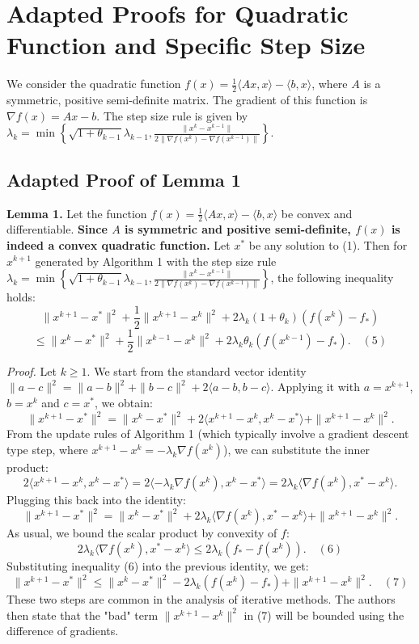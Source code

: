 \documentclass{article}
\begin{document}
\section*{Adapted Proofs for Quadratic Function and Specific Step Size}

We consider the quadratic function $f(x) = \frac{1}{2} \langle Ax, x \rangle - \langle b, x \rangle$, where $A$ is a symmetric, positive semi-definite matrix. The gradient of this function is $\nabla f(x) = Ax - b$.
The step size rule is given by $\lambda_k = \min \left\{ \sqrt{1 + \theta_{k-1}} \lambda_{k-1}, \frac{\|x^k - x^{k-1}\|}{2\|\nabla f(x^k) - \nabla f(x^{k-1})\|} \right\}$.

\subsection*{Adapted Proof of Lemma 1}

\textbf{Lemma 1.} Let the function $f(x) = \frac{1}{2} \langle Ax, x \rangle - \langle b, x \rangle$ be convex and differentiable. \textbf{Since $A$ is symmetric and positive semi-definite, $f(x)$ is indeed a convex quadratic function.} Let $x^*$ be any solution to (1). Then for $x^{k+1}$ generated by Algorithm 1 with the step size rule $\lambda_k = \min \left\{ \sqrt{1 + \theta_{k-1}} \lambda_{k-1}, \frac{\|x^k - x^{k-1}\|}{2\|\nabla f(x^k) - \nabla f(x^{k-1})\|} \right\}$, the following inequality holds:
$$ \|x^{k+1} - x^*\|^2 + \frac{1}{2}\|x^{k+1} - x^k\|^2 + 2\lambda_k(1+\theta_k)(f(x^k) - f_*) $$
$$ \leq \|x^k - x^*\|^2 + \frac{1}{2}\|x^{k-1} - x^k\|^2 + 2\lambda_k\theta_k(f(x^{k-1}) - f_*). \quad (5) $$

\textit{Proof.} Let $k \geq 1$. We start from the standard vector identity $\|a-c\|^2 = \|a-b\|^2 + \|b-c\|^2 + 2\langle a-b, b-c \rangle$. Applying it with $a=x^{k+1}$, $b=x^k$ and $c=x^*$, we obtain:
$$ \|x^{k+1} - x^*\|^2 = \|x^k - x^*\|^2 + 2\langle x^{k+1} - x^k, x^k - x^* \rangle + \|x^{k+1} - x^k\|^2. $$
From the update rules of Algorithm 1 (which typically involve a gradient descent type step, where $x^{k+1} - x^k = -\lambda_k \nabla f(x^k)$), we can substitute the inner product:
$$ 2\langle x^{k+1} - x^k, x^k - x^* \rangle = 2\langle -\lambda_k \nabla f(x^k), x^k - x^* \rangle = 2\lambda_k\langle \nabla f(x^k), x^* - x^k \rangle. $$
Plugging this back into the identity:
$$ \|x^{k+1} - x^*\|^2 = \|x^k - x^*\|^2 + 2\lambda_k\langle \nabla f(x^k), x^* - x^k \rangle + \|x^{k+1} - x^k\|^2. $$
As usual, we bound the scalar product by convexity of $f$:
$$ 2\lambda_k\langle \nabla f(x^k), x^* - x^k \rangle \leq 2\lambda_k(f_* - f(x^k)). \quad (6) $$
Substituting inequality (6) into the previous identity, we get:
$$ \|x^{k+1} - x^*\|^2 \leq \|x^k - x^*\|^2 - 2\lambda_k(f(x^k) - f_*) + \|x^{k+1} - x^k\|^2. \quad (7) $$
These two steps are common in the analysis of iterative methods. The authors then state that the "bad" term $\|x^{k+1} - x^k\|^2$ in (7) will be bounded using the difference of gradients.
\end{document}
